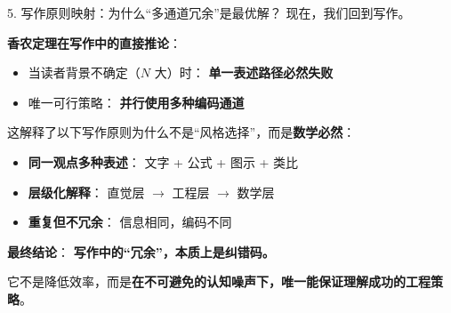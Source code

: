\documentclass[11pt, a4paper]{ctexart}
\newcommand{\lowfreq}[1]{%
	{\Large\bfseries\color{red!60!black} #1}%
}
\begin{document}
\begin{mathbox}{5. 写作原则映射：为什么“多通道冗余”是最优解？}
	现在，我们回到写作。
	
	\textbf{香农定理在写作中的直接推论}：
	
	\begin{itemize}
		\item 当读者背景不确定（$N$ 大）时：  
		\lowfreq{单一表述路径必然失败}
		
		\item 唯一可行策略：  
		\lowfreq{并行使用多种编码通道}
	\end{itemize}
	
	\vspace{0.5em}
	这解释了以下写作原则为什么不是“风格选择”，而是\textbf{数学必然}：
	
	\begin{itemize}
		\item \textbf{同一观点多种表述}：  
		文字 + 公式 + 图示 + 类比
		
		\item \textbf{层级化解释}：  
		直觉层 $\rightarrow$ 工程层 $\rightarrow$ 数学层
		
		\item \textbf{重复但不冗余}：  
		信息相同，编码不同
	\end{itemize}
	
	\textbf{最终结论}：  
	\lowfreq{写作中的“冗余”，本质上是纠错码。}  
	它不是降低效率，而是\textbf{在不可避免的认知噪声下，唯一能保证理解成功的工程策略}。
\end{mathbox}

	
	
	
\end{document}
